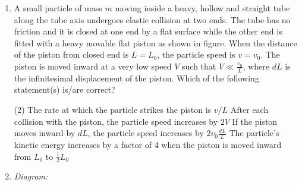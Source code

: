 
\begin{enumerate}
    \item A small particle of mass \( m \) moving inside a heavy, hollow and straight tube along the tube axis undergoes elastic collision at two ends. The tube has no friction and it is closed at one end by a flat surface while the other end is fitted with a heavy movable flat piston as shown in figure. When the distance of the piston from closed end is \( L = L_0 \), the particle speed is \( v = v_0 \). The piston is moved inward at a very low speed \( V \) such that \( V \ll \frac{v_0}{L} \), where \( dL \) is the infinitesimal displacement of the piston. Which of the following statement(s) is/are correct?
        \begin{tasks}(2)
        	\task The rate at which the particle strikes the piston is \( v/L \)
        	\task After each collision with the piston, the particle speed increases by \(2V\)
        	\task If the piston moves inward by \(dL\), the particle speed increases by \(2v_0 \frac{dL}{L}\)
        	\task The particle’s kinetic energy increases by a factor of 4 when the piston is moved inward from \(L_0\) to \(\frac{1}{2}L_0\)
        \end{tasks}
    \item[\null] \textit{Diagram:}
        \begin{center}
        \end{center}
\end{enumerate}
